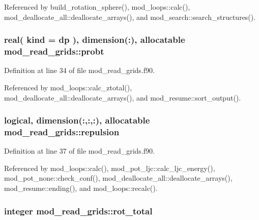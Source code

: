 Referenced by build\+\_\+rotation\+\_\+sphere(), mod\+\_\+loops\+::calc(), mod\+\_\+deallocate\+\_\+all\+::deallocate\+\_\+arrays(), and mod\+\_\+search\+::search\+\_\+structures().

\subsubsection[{\texorpdfstring{probt}{probt}}]{\setlength{\rightskip}{0pt plus 5cm}real( kind = dp ), dimension(\+:), allocatable mod\+\_\+read\+\_\+grids\+::probt}\hypertarget{namespacemod__read__grids_a019fc7a33467abb84318794f59bff9cd}{}\label{namespacemod__read__grids_a019fc7a33467abb84318794f59bff9cd}


Definition at line 34 of file mod\+\_\+read\+\_\+grids.\+f90.



Referenced by mod\+\_\+loops\+::calc\+\_\+ztotal(), mod\+\_\+deallocate\+\_\+all\+::deallocate\+\_\+arrays(), and mod\+\_\+resume\+::sort\+\_\+output().

\subsubsection[{\texorpdfstring{repulsion}{repulsion}}]{\setlength{\rightskip}{0pt plus 5cm}logical, dimension(\+:,\+:,\+:), allocatable mod\+\_\+read\+\_\+grids\+::repulsion}\hypertarget{namespacemod__read__grids_a78b7a722975e665430c061c6cca83ca0}{}\label{namespacemod__read__grids_a78b7a722975e665430c061c6cca83ca0}


Definition at line 37 of file mod\+\_\+read\+\_\+grids.\+f90.



Referenced by mod\+\_\+loops\+::calc(), mod\+\_\+pot\+\_\+ljc\+::calc\+\_\+ljc\+\_\+energy(), mod\+\_\+pot\+\_\+none\+::check\+\_\+conf(), mod\+\_\+deallocate\+\_\+all\+::deallocate\+\_\+arrays(), mod\+\_\+resume\+::ending(), and mod\+\_\+loops\+::recalc().

\subsubsection[{\texorpdfstring{rot\+\_\+total}{rot_total}}]{\setlength{\rightskip}{0pt plus 5cm}integer mod\+\_\+read\+\_\+grids\+::rot\+\_\+total}\hypertarget{namespacemod__read__grids_aca954e32e5f53302912f372a99affe97}{}\label{namespacemod__read__grids_aca954e32e5f53302912f372a99affe97}


